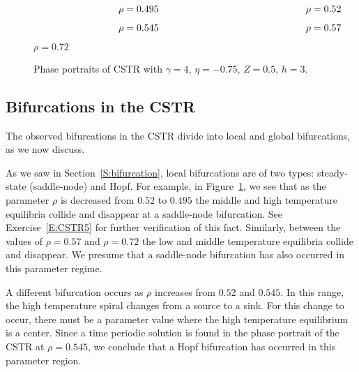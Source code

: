 \begin{figure}
           \centerline{%
	   }	
		\vspace*{-0.2in}	
		$\hspace{1.2in} \mbox{$\rho=0.495$ \hspace{2.0in} $\rho=0.52$}$
           \centerline{%
	   }
		\vspace*{-0.4in}
		
		$\hspace{1.2in} \mbox{$\rho=0.545$ \hspace{2.0in} $\rho=0.57$}$
		\vspace{0.4in}
	   \centerline{%
           }
 		\vspace*{-0.8in}
		
		\hspace{2.6in} $\rho=0.72$
          \caption{Phase portraits of CSTR \protect{} 
	with $\gamma=4$, $\eta=-0.75$, $Z=0.5$, $h =3$.}
           \label{F:CSTR}
\end{figure}


\subsection*{Bifurcations in the CSTR}


The observed bifurcations in the CSTR divide into local and global 
bifurcations, as we now discuss.

As we saw in Section~\ref{S:bifurcation}, local bifurcations are of two 
types: steady-state (saddle-node) and Hopf.  
  For example, in Figure~\ref{F:CSTR}, we see that as 
the parameter $\rho$ is decreased from $0.52$ to $0.495$ the middle and high 
temperature equilibria collide and disappear at a saddle-node bifurcation.  
See Exercise~\ref{E:CSTR5} for further verification of this fact.  Similarly,
between the values of $\rho=0.57$ and $\rho=0.72$ the low and middle 
temperature equilibria collide and disappear.  We presume that a  
saddle-node bifurcation has also occurred in this parameter regime.

A different bifurcation occurs as $\rho$ increases from
$0.52$ and $0.545$.  In this range, the high temperature spiral
changes from a source to a sink.  For this change to occur,
there must be a parameter value where the high temperature
equilibrium is a center.  Since a time periodic solution
is found in the phase portrait of the CSTR at $\rho=0.545$, we 
conclude that a Hopf bifurcation has occurred in this parameter region.

